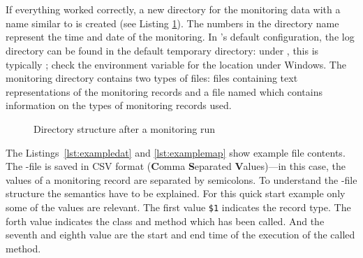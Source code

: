 \setBashListing 		
	



\quad\


\quad\

\noindent If everything worked correctly, a new directory for the monitoring data with a name similar to  is created (see Listing \ref{fig:logtree}). %
The numbers in the directory name represent the time and date of the monitoring. %
In \Kieker's default configuration, the log directory can be found in the default temporary directory: under \UnixLikeSystems{}, this is typically ; %
check the environment variable  for the location  under Windows. %
The monitoring directory contains two types of files:  files containing text representations of the monitoring records and a %
file named  which contains information on the types of monitoring records used. 

\begin{figure}[H]
\begin{graybox}
\end{graybox}
\caption{Directory structure after a monitoring run}
\label{fig:logtree}
\end{figure}

\enlargethispage{1.5cm}

The Listings~\ref{lst:exampledat} and \ref{lst:examplemap} show example file contents. The -file is saved in CSV format (\textbf{C}omma \textbf{S}eparated \textbf{V}alues)---in this case, the values of a monitoring record are separated by semicolons. To understand the -file structure the semantics have to be explained. For this quick start example only some of the values are relevant. The first value \verb!$1! indicates the record type. The forth value indicates the class and method which has been called. And the seventh and eighth value are the start and end time of the execution of the called method.

